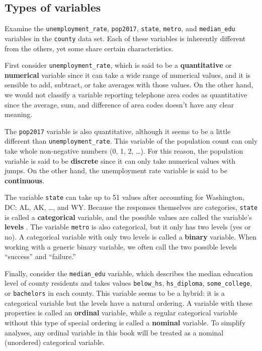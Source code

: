 \documentclass[
  10pt,
  openany]{book}
\theoremstyle{definition}
\theoremstyle{definition}
\theoremstyle{definition}
\theoremstyle{definition}
\theoremstyle{remark}
\begin{document}
\subsection{Types of variables}\label{variable-types}

Examine the \texttt{unemployment\_rate}, \texttt{pop2017}, \texttt{state}, \texttt{metro}, and \texttt{median\_edu} variables in the \texttt{county} data set.
Each of these variables is inherently different from the others, yet some share certain characteristics.

First consider \texttt{unemployment\_rate}, which is said to be a \textbf{quantitative} or \textbf{numerical} variable since it can take a wide range of numerical values, and it is sensible to add, subtract, or take averages with those values.
On the other hand, we would not classify a variable reporting telephone area codes as quantitative since the average, sum, and difference of area codes doesn't have any clear meaning.

The \texttt{pop2017} variable is also quantitative, although it seems to be a little different than \texttt{unemployment\_rate}.
This variable of the population count can only take whole non-negative numbers (0, 1, 2, \ldots).
For this reason, the population variable is said to be \textbf{discrete} since it can only take numerical values with jumps.
On the other hand, the unemployment rate variable is said to be \textbf{continuous}.

The variable \texttt{state} can take up to 51 values after accounting for Washington, DC: AL, AK, \ldots, and WY.
Because the responses themselves are categories, \texttt{state} is called a \textbf{categorical} variable, and the possible values are called the variable's \textbf{levels} . The variable \texttt{metro} is also categorical, but it only has two levels (yes or no). A categorical variable with only two levels is called a \textbf{binary} variable. When working with a generic binary variable, we often call the two possible levels ``success'' and ``failure.''

Finally, consider the \texttt{median\_edu} variable, which describes the median education level of county residents and takes values \texttt{below\_hs}, \texttt{hs\_diploma}, \texttt{some\_college}, or \texttt{bachelors} in each county.
This variable seems to be a hybrid: it is a categorical variable but the levels have a natural ordering.
A variable with these properties is called an \textbf{ordinal} variable, while a regular categorical variable without this type of special ordering is called a \textbf{nominal} variable.
To simplify analyses, any ordinal variable in this book will be treated as a nominal (unordered) categorical variable.
\end{document}
